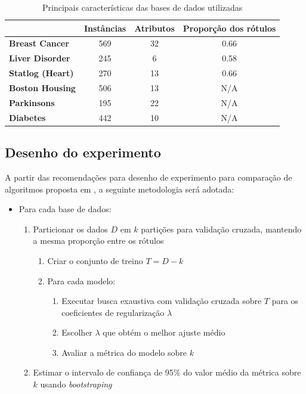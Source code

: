 \documentclass[conference]{IEEEtran}
\begin{document}
	\begin{table}[thpbh]
		\caption{Principais características das bases de dados utilizadas}
		\label{tab:datasets}
		\begin{tabular}{l|c|c|c|}
			\cline{2-4}
			& \textbf{Instâncias} & \textbf{Atributos} & \textbf{Proporção dos rótulos} \\ \hline
			\multicolumn{1}{|l|}{\textbf{Breast Cancer}}   & 569                 & 32                 & 0.66                           \\ \hline
			\multicolumn{1}{|l|}{\textbf{Liver Disorder}}  & 245                 & 6                  & 0.58                           \\ \hline
			\multicolumn{1}{|l|}{\textbf{Statlog (Heart)}} & 270                 & 13                 & 0.66                           \\ \hline
			\multicolumn{1}{|l|}{\textbf{Boston Housing}}  & 506                 & 13                 & N/A                            \\ \hline
			\multicolumn{1}{|l|}{\textbf{Parkinsons}}      & 195                 & 22                 & N/A                            \\ \hline
			\multicolumn{1}{|l|}{\textbf{Diabetes}}        & 442                 & 10                 & N/A                            \\ \hline
		\end{tabular}
	\end{table}
	
	\subsection{Desenho do experimento}
	A partir das recomendações para desenho de experimento para comparação de algoritmos proposta em \cite{salzberg1997comparing}, a seguinte metodologia será adotada:
	\begin{itemize}
		\item Para cada base de dados:
			\begin{enumerate}
			\item Particionar os dados $D$ em $k$ partições para validação cruzada, mantendo a mesma proporção entre os rótulos
			\begin{enumerate}
				\item Criar o conjunto de treino $T = D - k$
				\item Para cada modelo:
				\begin{enumerate}
					\item Executar busca exaustiva com validação cruzada sobre $T$ para os coeficientes de regularização $\lambda$ \label{item:grid-search}
					\item Escolher $\lambda$ que obtém o melhor ajuste médio 
					\item Avaliar a métrica do modelo sobre $k$
				\end{enumerate}
			\end{enumerate}
			\item Estimar o intervalo de confiança de 95\% do valor médio da métrica sobre $k$ usando \textit{bootstraping}
		\end{enumerate}
	\end{itemize}
	
\end{document}
